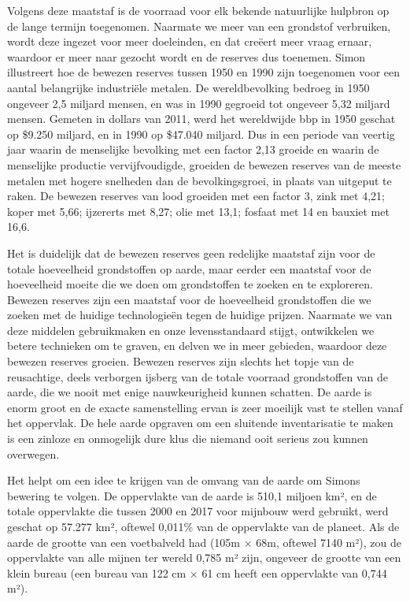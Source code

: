 Volgens deze maatstaf is de voorraad voor elk bekende natuurlijke
hulpbron op de lange termijn toegenomen. Naarmate we meer van een
grondstof verbruiken, wordt deze ingezet voor meer doeleinden, en dat
creëert meer vraag ernaar, waardoor er meer naar gezocht wordt en de
reserves dus toenemen. Simon illustreert hoe de bewezen reserves tussen
1950 en 1990 zijn toegenomen voor een aantal belangrijke industriële
metalen. De wereldbevolking bedroeg in 1950 ongeveer 2,5 miljard mensen,
en was in 1990 gegroeid tot ongeveer 5,32 miljard
mensen.\autocite{28} Gemeten in dollars van 2011, werd het wereldwijde bbp in 1950
geschat op \$9.250 miljard, en in 1990 op \$47.040
miljard.\autocite{29} Dus in een periode van veertig jaar waarin de
menselijke bevolking met een factor 2,13 groeide en waarin de menselijke
productie vervijfvoudigde, groeiden de bewezen reserves van de meeste
metalen met hogere snelheden dan de bevolkingsgroei, in plaats van
uitgeput te raken. De bewezen reserves van lood groeiden met een factor
3, zink met 4,21; koper met 5,66; ijzererts met 8,27; olie met 13,1;
fosfaat met 14 en bauxiet met 16,6.\autocite{30}

Het is duidelijk dat de bewezen reserves geen redelijke maatstaf zijn
voor de totale hoeveelheid grondstoffen op aarde, maar eerder een
maatstaf voor de hoeveelheid moeite die we doen om grondstoffen te
zoeken en te exploreren. Bewezen reserves zijn een maatstaf voor de
hoeveelheid grondstoffen die we zoeken met de huidige technologieën
tegen de huidige prijzen. Naarmate we van deze middelen gebruikmaken en
onze levensstandaard stijgt, ontwikkelen we betere technieken om te
graven, en delven we in meer gebieden, waardoor deze bewezen reserves
groeien. Bewezen reserves zijn slechts het topje van de reusachtige,
deels verborgen ijsberg van de totale voorraad grondstoffen van de
aarde, die we nooit met enige nauwkeurigheid kunnen schatten. De aarde
is enorm groot en de exacte samenstelling ervan is zeer moeilijk vast te
stellen vanaf het oppervlak. De hele aarde opgraven om een sluitende
inventarisatie te maken is een zinloze en onmogelijk dure klus die
niemand ooit serieus zou kunnen overwegen.

Het helpt om een idee te krijgen van de omvang van de aarde om Simons
bewering te volgen. De oppervlakte van de aarde is 510,1 miljoen km², en
de totale oppervlakte die tussen 2000 en 2017 voor mijnbouw werd
gebruikt, werd geschat op 57.277 km², oftewel 0,011\% van de oppervlakte
van de planeet.\autocite{31} Als de
aarde de grootte van een voetbalveld had (105m × 68m, oftewel 7140 m²),
zou de oppervlakte van alle mijnen ter wereld 0,785 m² zijn, ongeveer de
grootte van een klein bureau (een bureau van 122 cm × 61 cm heeft een
oppervlakte van 0,744 m²).

